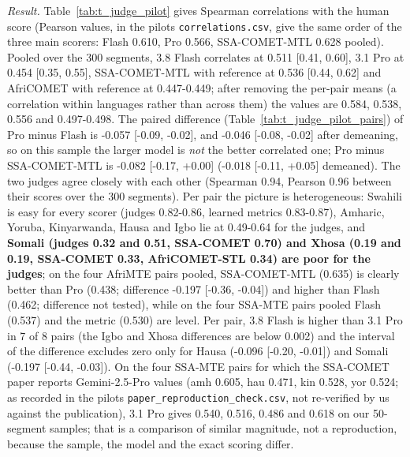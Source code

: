 \emph{Result.} Table~\ref{tab:t_judge_pilot} gives Spearman correlations with the human score (Pearson values, in the pilot\textquotesingle s \texttt{correlations.csv}, give the same order of the three main scorers: Flash 0.610, Pro 0.566, SSA-COMET-MTL 0.628 pooled). Pooled over the 300 segments, 3.8 Flash correlates at 0.511 {[}0.41, 0.60{]}, 3.1 Pro at 0.454 {[}0.35, 0.55{]}, SSA-COMET-MTL with reference at 0.536 {[}0.44, 0.62{]} and AfriCOMET with reference at 0.447-0.449; after removing the per-pair means (a correlation within languages rather than across them) the values are 0.584, 0.538, 0.556 and 0.497-0.498. The paired difference (Table~\ref{tab:t_judge_pilot_pairs}) of Pro minus Flash is -0.057 {[}-0.09, -0.02{]}, and -0.046 {[}-0.08, -0.02{]} after demeaning, so on this sample the larger model is \emph{not} the better correlated one; Pro minus SSA-COMET-MTL is -0.082 {[}-0.17, +0.00{]} (-0.018 {[}-0.11, +0.05{]} demeaned). The two judges agree closely with each other (Spearman 0.94, Pearson 0.96 between their scores over the 300 segments). Per pair the picture is heterogeneous: Swahili is easy for every scorer (judges 0.82-0.86, learned metrics 0.83-0.87), Amharic, Yoruba, Kinyarwanda, Hausa and Igbo lie at 0.49-0.64 for the judges, and \textbf{Somali (judges 0.32 and 0.51, SSA-COMET 0.70) and Xhosa (0.19 and 0.19, SSA-COMET 0.33, AfriCOMET-STL 0.34) are poor for the judges}; on the four AfriMTE pairs pooled, SSA-COMET-MTL (0.635) is clearly better than Pro (0.438; difference -0.197 {[}-0.36, -0.04{]}) and higher than Flash (0.462; difference not tested), while on the four SSA-MTE pairs pooled Flash (0.537) and the metric (0.530) are level. Per pair, 3.8 Flash is higher than 3.1 Pro in 7 of 8 pairs (the Igbo and Xhosa differences are below 0.002) and the interval of the difference excludes zero only for Hausa (-0.096 {[}-0.20, -0.01{]}) and Somali (-0.197 {[}-0.44, -0.03{]}). On the four SSA-MTE pairs for which the SSA-COMET paper reports Gemini-2.5-Pro values (amh 0.605, hau 0.471, kin 0.528, yor 0.524; as recorded in the pilot\textquotesingle s \texttt{paper\_reproduction\_check.csv}, not re-verified by us against the publication), 3.1 Pro gives 0.540, 0.516, 0.486 and 0.618 on our 50-segment samples; that is a comparison of similar magnitude, not a reproduction, because the sample, the model and the exact scoring differ.

